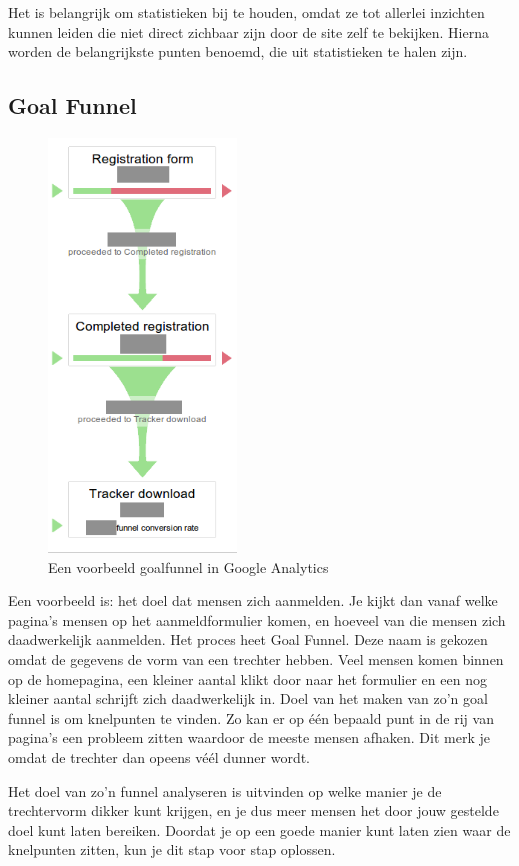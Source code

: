 \documentclass[a4paper, 10pt, pdftex]{report}
\begin{document}
    Het is belangrijk om statistieken bij te houden, omdat ze tot allerlei inzichten kunnen leiden die niet direct zichbaar zijn door de site zelf te bekijken. Hierna worden de belangrijkste punten benoemd, die uit statistieken te halen zijn.

    \subsection{Goal Funnel}
      \begin{figure}
      \caption{Een voorbeeld goalfunnel in Google Analytics}
        \includegraphics[width=50mm]{../images/goalfunnel}
    \end{figure}

    Een voorbeeld is: het doel dat mensen zich aanmelden. Je kijkt dan vanaf welke pagina's mensen op het aanmeldformulier komen, en hoeveel van die mensen zich daadwerkelijk aanmelden. Het proces heet Goal Funnel. Deze naam is gekozen omdat de gegevens de vorm van een trechter hebben. Veel mensen komen binnen op de homepagina, een kleiner aantal klikt door naar het formulier en een nog kleiner aantal schrijft zich daadwerkelijk in. Doel van het maken van zo'n goal funnel is om knelpunten te vinden. Zo kan er op \'e\'en bepaald punt in de rij van pagina's een probleem zitten waardoor de meeste mensen afhaken. Dit merk je omdat de trechter dan opeens v\'e\'el dunner wordt.

    Het doel van zo'n funnel analyseren is uitvinden op welke manier je de trechtervorm dikker kunt krijgen, en je dus meer mensen het door jouw gestelde doel kunt laten bereiken. Doordat je op een goede manier kunt laten zien waar de knelpunten zitten, kun je dit stap voor stap oplossen.
\end{document}
